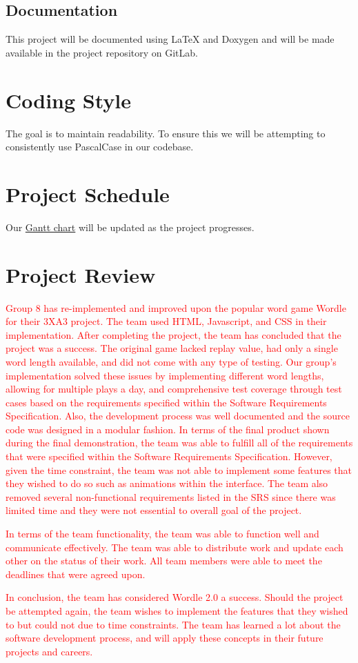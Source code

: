 \documentclass{article}
\begin{document}
	\subsection{Documentation}
	This project will be documented using LaTeX and Doxygen and will be made 
	available in the project repository on GitLab.
	
	\section{Coding Style}
	The goal is to maintain readability. To ensure this we will be 
	attempting to consistently use PascalCase in our codebase.
	
	\section{Project Schedule}
	
	Our 
	\href{https://gitlab.cas.mcmaster.ca/zacharin/wordle_clone_3xa3_l01_group8/-/tree/main/ProjectSchedule}{Gantt
		chart} will be updated as the project progresses.
	
	\section{Project Review}
	\textcolor{red}{Group 8 has re-implemented and improved upon the popular word game Wordle for their 3XA3 project. The team used HTML, Javascript, and CSS in their implementation. After completing the project, the team has concluded that the project was a success. The original game lacked replay value, had only a single word length available, and did not come with any type of testing. Our group's implementation solved these issues by implementing different word lengths, allowing for multiple plays a day, and comprehensive test coverage through test cases based on the requirements specified within the Software Requirements Specification. Also, the development process was well documented and the source code was designed in a modular fashion. In terms of the final product shown during the final demonstration, the team was able to fulfill all of the requirements that were specified within the Software Requirements Specification. However, given the time constraint, the team was not able to implement some features that they wished to do so such as animations within the interface. The team also removed several non-functional requirements listed in the SRS since there was limited time and they were not essential to overall goal of the project. }
	\par \textcolor{red}{In terms of the team functionality, the team was able to function well and communicate effectively. The team was able to distribute work and update each other on the status of their work. All team members were able to meet the deadlines that were agreed upon.}
	\par \textcolor{red}{In conclusion, the team has considered Wordle 2.0 a success. Should the project be attempted again, the team wishes to implement the features that they wished to but could not due to time constraints. The team has learned a lot about the software development process, and will apply these concepts in their future projects and careers.}
	
\end{document}
